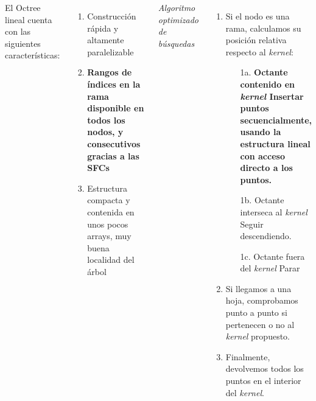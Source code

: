 \documentclass[aspectratio=169]{beamer}
\begin{document}
\begin{frame}
    \begin{columns}
        El Octree lineal cuenta con las siguientes características:
        \begin{enumerate}
            \item Construcción rápida y altamente paralelizable
            \item \textbf{Rangos de índices en la rama disponible en todos los nodos, y consecutivos gracias a las SFCs}
            \item Estructura compacta y contenida en unos pocos arrays, muy buena localidad del árbol
        \end{enumerate}
        \textit{Algoritmo optimizado de búsquedas}
        \begin{enumerate}
            \item Si el nodo es una rama, calculamos su posición relativa respecto al \textit{kernel}:
              \begin{enumerate}
                    \item[1a.] \textbf{Octante contenido en \textit{kernel} \textrightarrow\: Insertar puntos secuencialmente, usando la estructura lineal con acceso directo a los puntos.}
                   \item[1b.] Octante interseca al \textit{kernel} \textrightarrow\: Seguir descendiendo.
                   \item[1c.] Octante fuera del \textit{kernel} \textrightarrow\:  Parar
              \end{enumerate}
            \item Si llegamos a una hoja, comprobamos punto a punto si pertenecen o no al \textit{kernel} propuesto. 
            \item Finalmente, devolvemos todos los puntos en el interior del \textit{kernel}.
        \end{enumerate}
    \end{columns}

\end{frame}
\end{document}
